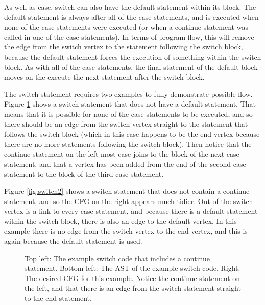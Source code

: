 As well as case, switch can also have the default statement within its block. The default statement is always after all of the case statements, and is executed when none of the case statements were executed (or when a continue statement was called in one of the case statements). In terms of program flow, this will remove the edge from the switch vertex to the statement following the switch block, because the default statement forces the execution of something within the switch block. As with all of the case statements, the final statement of the default block moves on the execute the next statement after the switch block.

The switch statement requires two examples to fully demonstrate possible flow. Figure \ref{fig:switch1} shows a switch statement that does not have a default statement. That means that it is possible for none of the case statements to be executed, and so there should be an edge from the switch vertex straight to the statement that follows the switch block (which in this case happens to be the end vertex because there are no more statements following the switch block). Then notice that the continue statement on the left-most case joins to the block of the next case statement, and that a vertex has been added from the end of the second case statement to the block of the third case statement.

Figure \ref{fig:switch2} shows a switch statement that does not contain a continue statement, and so the CFG on the right appears much tidier. Out of the switch vertex is a link to every case statement, and because there is a default statement within the switch block, there is also an edge to the default vertex. In this example there is no edge from the switch vertex to the end vertex, and this is again because the default statement is used.

\begin{figure}
\centering
\begin{minipage}{.6\textwidth}
  \centering
  
\end{minipage}%
\begin{minipage}{.3\textwidth}
  \centering
\end{minipage}
\caption{Top left: The example switch code that includes a continue statement. Bottom left: The AST of the example switch code. Right: The desired CFG for this example. Notice the continue statement on the left, and that there is an edge from the switch statement straight to the end statement.}
\label{fig:switch1}
\end{figure}

